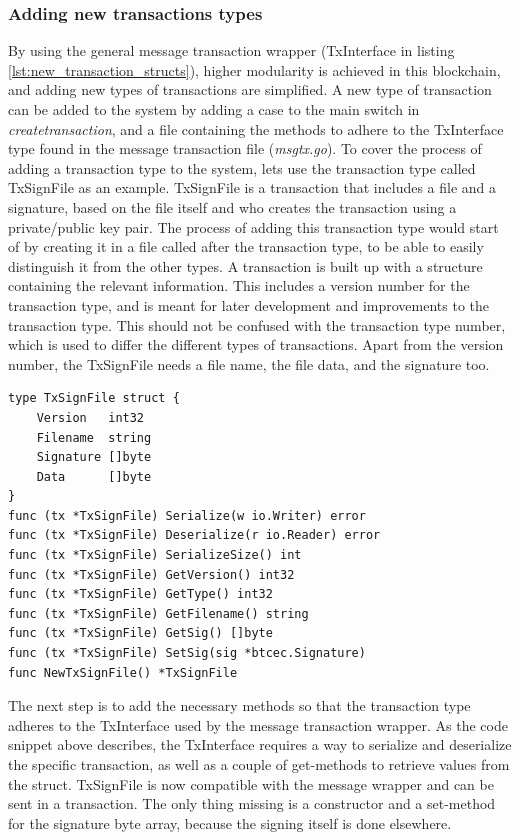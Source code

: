 \documentclass[12pt]{article}
\begin{document}
\subsubsection{Adding new transactions types}
By using the general message transaction wrapper (TxInterface in listing \ref{lst:new_transaction_structs}), higher modularity is achieved in this blockchain, and adding new types of transactions are simplified. A new type of transaction can be added to the system by adding a case to the main switch in  {\it{createtransaction}}, and a file containing the methods to adhere to the TxInterface type found in the message transaction file ({\it{msgtx.go}}). To cover the process of adding a transaction type to the system, lets use the transaction type called TxSignFile as an example. TxSignFile is a transaction that includes a file and a signature, based on the file itself and who creates the transaction using a private/public key pair. The process of adding this transaction type would start of by creating it in a file called after the transaction type, to be able to easily distinguish it from the other types. A transaction is built up with a structure containing the relevant information. This includes a version number for the transaction type, and is meant for later development and improvements to the transaction type. This should not be confused with the transaction type number, which is used to differ the different types of transactions. Apart from the version number, the TxSignFile needs a file name, the file data, and the signature too.
\begin{lstlisting}[float=h!,caption={TxSignFile},label=lst:txsign]
type TxSignFile struct {
	Version   int32
	Filename  string
	Signature []byte
	Data      []byte
}
func (tx *TxSignFile) Serialize(w io.Writer) error 
func (tx *TxSignFile) Deserialize(r io.Reader) error 
func (tx *TxSignFile) SerializeSize() int 
func (tx *TxSignFile) GetVersion() int32 
func (tx *TxSignFile) GetType() int32 
func (tx *TxSignFile) GetFilename() string 
func (tx *TxSignFile) GetSig() []byte
func (tx *TxSignFile) SetSig(sig *btcec.Signature)
func NewTxSignFile() *TxSignFile
\end{lstlisting}
The next step is to add the necessary methods so that the transaction type adheres to the TxInterface used by the message transaction wrapper. As the code snippet above describes, the TxInterface requires a way to serialize and deserialize the specific transaction, as well as a couple of get-methods to retrieve values from the struct. TxSignFile is now compatible with the message wrapper and can be sent in a transaction. The only thing missing is a constructor and a set-method for the signature byte array, because the signing itself is done elsewhere. 
\end{document}

